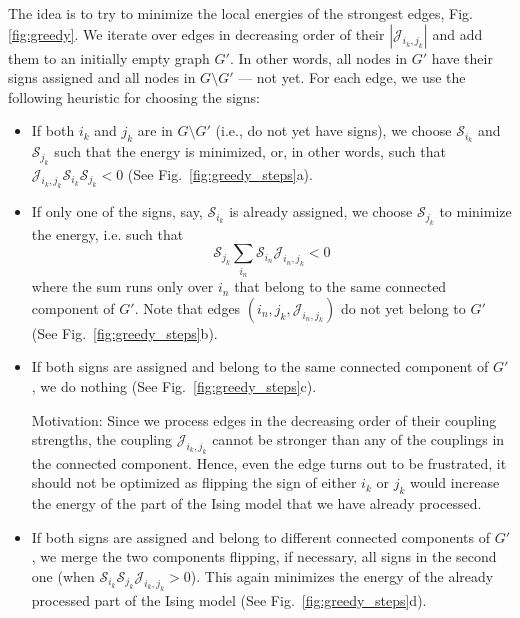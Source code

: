 The idea is to try to minimize the local energies of the strongest edges, Fig. \ref{fig:greedy}. We iterate over edges in decreasing order of their $|\mathcal{J}_{i_k,j_k}|$ and add them to an initially empty graph $G'$. In other words, all nodes in $G'$ have their signs assigned and all nodes in $G \setminus G'$ --- not yet. For each edge, we use the following heuristic for choosing the signs:

\begin{itemize}[topsep=0pt, noitemsep]
    \item If both $i_k$ and $j_k$ are in $G\setminus G'$ (i.e.,  do not yet have signs), we choose $\mathcal{S}_{i_k}$ and $\mathcal{S}_{j_k}$ such that the energy is minimized, or, in other words, such that $\mathcal{J}_{i_k,j_k} \mathcal{S}_{i_k} \mathcal{S}_{j_k} < 0$ (See Fig.~\ref{fig:greedy_steps}a).
    
    \item If only one of the signs, say, $\mathcal{S}_{i_k}$ is already assigned, we choose $\mathcal{S}_{j_k}$ to minimize the energy, i.e. such that
    \begin{equation*}
        \mathcal{S}_{j_k}
            \sum_{i_n} \mathcal{S}_{i_n} \mathcal{J}_{i_n,j_k} < 0
    \end{equation*}
    where the sum runs only over $i_n$ that belong to the same connected component of $G'$. Note that edges $(i_n, j_k, \mathcal{J}_{i_n, j_k})$ do not yet belong to $G'$ (See Fig.~\ref{fig:greedy_steps}b).

    \item If both signs are assigned and belong to the same connected component of $G'$, we do nothing (See Fig.~\ref{fig:greedy_steps}c).    
    
    Motivation: Since we process edges in the decreasing order of their coupling strengths, the coupling $\mathcal{J}_{i_k, j_k}$ cannot be stronger than any of the couplings in the connected component. Hence, even the edge turns out to be frustrated, it should not be optimized as flipping the sign of either $i_k$ or $j_k$ would increase the energy of the part of the Ising model that we have already processed.
    
    \item If both signs are assigned and belong to different connected components of $G'$, we merge the two components flipping, if necessary, all signs in the second one (when $\mathcal{S}_{i_k} \mathcal{S}_{j_k} \mathcal{J}_{i_k,j_k} > 0$). This again minimizes the energy of the already processed part of the Ising model (See Fig.~\ref{fig:greedy_steps}d).
\end{itemize}

